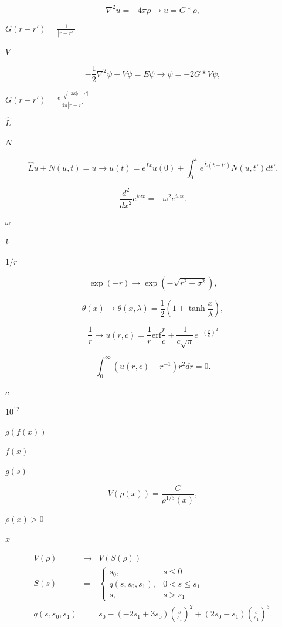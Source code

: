 \documentclass{article}
\begin{document}
\[
\nabla^{2} u = -4\pi\rho \to u=G \ast \rho,
\]
\pagebreak

$G(r-r')=\frac{1}{|r-r'|}$
\pagebreak

$V$
\pagebreak

\[
- \frac{1}{2} \nabla^{2} \psi + V\psi = E \psi \to \psi = -2G \ast V\psi,
\]
\pagebreak

$G(r-r')=\frac{e^{-\sqrt{-2E|r-r'|}}}{4\pi |r-r'|} $
\pagebreak

$\hat{L}$
\pagebreak

$N$
\pagebreak

\[
\hat{L}u + N(u,t) = \dot{u} \to u(t) = e^{\hat{L} t} u(0) + \int _{0}^{t} e^{\hat{L} (t-t')} N(u,t') \mathit{d}t'.
\]
\pagebreak

\[
\frac{d^{2}}{\mathit{dx}^{2}}e^{i\omega x}=-\omega ^{2}e^{i\omega x}.
\]
\pagebreak

$\omega$
\pagebreak

$k$
\pagebreak

$1/r$
\pagebreak

\[
\exp(-r) \to \exp (-\sqrt{r^{2}+\sigma ^{2}}),
\]
\pagebreak

\[
\theta(x) \to \theta(x, \lambda) = \frac{1}{2} (1 + \tanh\frac{x}{\lambda}),
\]
\pagebreak

\[
\frac{1}{r} \to u(r,c) = \frac{1}{r} \mathrm{erf} \frac{r}{c} + \frac{1}{c\sqrt{\pi}} e^{-\left( \frac{r}{c} \right)^{2}}
\]
\pagebreak

\[
\int_{0}^{\infty} \left(u(r, c) - r^{-1}\right) r^{2} d\mathit{r} = 0.
\]
\pagebreak

$c$
\pagebreak

$10^{12}$
\pagebreak

$g(f(x))$
\pagebreak

$f(x)$
\pagebreak

$g(s)$
\pagebreak

\[
V(\rho(x)) = \frac{C}{\rho^{1/3}(x)},
\]
\pagebreak

$\rho (x)>0$
\pagebreak

$x$
\pagebreak

\begin{eqnarray*}
V(\rho) & \to & V(S(\rho)) \\
S(s) & = & \left\{ \begin{array}{ll} s_{0}, & s\le 0 \\ q(s, s_{0}, s_{1}), & 0 < s \le s_{1} \\ s, & s > s_{1} \end{array} \right. \\
q(s, s_{0}, s_{1}) & = & s_{0} - (-2s_{1} + 3s_{0}) \left( \frac{s}{s_{1}} \right)^{2} + (2s_{0} - s_{1}) \left(\frac{s}{s_{1}}\right)^{3}.
\end{eqnarray*}
\pagebreak
\end{document}
